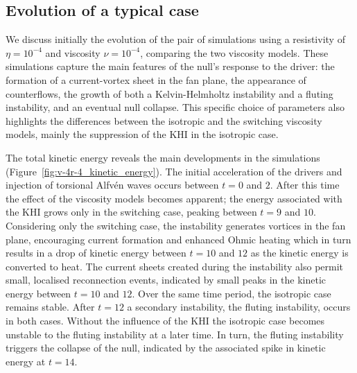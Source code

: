 \subsection{Evolution of a typical case}
\label{sec:null_point_khi_single_case}

We discuss initially the evolution of the pair of simulations using a resistivity of $\eta = 10^{-4}$ and viscosity $\nu = 10^{-4}$, comparing the two viscosity models. These simulations capture the main features of the null's response to the driver: the formation of a current-vortex sheet in the fan plane, the appearance of counterflows, the growth of both a Kelvin-Helmholtz instability and a fluting instability, and an eventual null collapse. This specific choice of parameters also highlights the differences between the isotropic and the switching viscosity models, mainly the suppression of the KHI in the isotropic case.

The total kinetic energy reveals the main developments in the simulations (Figure~\ref{fig:v-4r-4_kinetic_energy}). The initial acceleration of the drivers and injection of torsional Alfv\'en waves occurs between $t=0$ and $2$. After this time the effect of the viscosity models becomes apparent; the energy associated with the KHI grows only in the switching case, peaking between $t=9$ and $10$. Considering only the switching case, the instability generates vortices in the fan plane, encouraging current formation and enhanced Ohmic heating which in turn results in a drop of kinetic energy between $t=10$ and $12$ as the kinetic energy is converted to heat. The current sheets created during the instability also permit small, localised reconnection events, indicated by small peaks in the kinetic energy between $t=10$ and $12$. Over the same time period, the isotropic case remains stable. After $t=12$ a secondary instability, the fluting instability, occurs in both cases. Without the influence of the KHI the isotropic case becomes unstable to the fluting instability at a later time. In turn, the fluting instability triggers the collapse of the null, indicated by the associated spike in kinetic energy at $t=14$.


